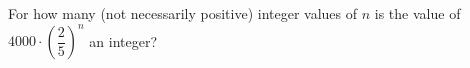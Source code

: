 For how many (not necessarily positive) integer values of $n$ is the value of $4000\cdot\left(\dfrac25\right)^n$ an integer?
